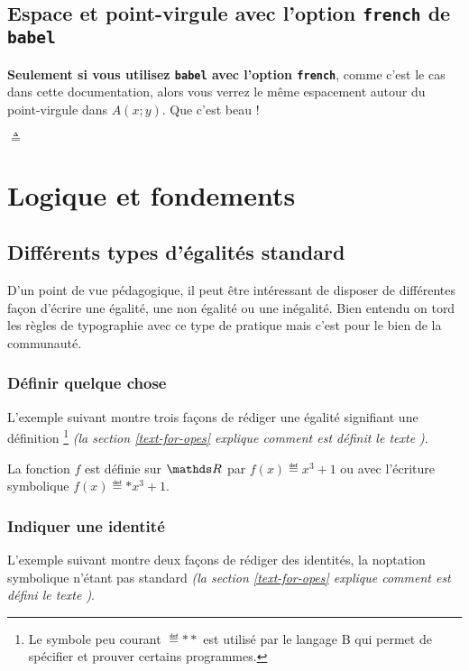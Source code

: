 \documentclass[12pt,a4paper]{article}
\theoremstyle{definition}
\begin{document}
\subsection{Espace et point-virgule avec l'option \texttt{french} de \texttt{babel}}

\textbf{Seulement si vous utilisez \texttt{babel} avec l'option \texttt{french}}, comme c'est le cas dans cette documentation, alors vous verrez le même espacement autour du point-virgule dans $A(x;y)$. Que c'est beau !




$\triangleq$
\section{Logique et fondements}

\subsection{Différents types d'égalités \og standard \fg}

D'un point de vue pédagogique, il peut être intéressant de disposer de différentes façon d'écrire une égalité, une non égalité ou une inégalité.
Bien entendu on tord les règles de typographie avec ce type de pratique mais c'est pour le bien de la communauté.

\subsubsection{Définir quelque chose}

L'exemple suivant montre trois façons de rédiger une égalité signifiant une définition
\footnote{
	Le symbole peu courant $\eqdef**$ est utilisé par le langage B qui permet de spécifier et prouver certains programmes.
}
\emph{(la section \ref{text-for-opes} explique comment est définit le texte \emph{\og \textopdef \fg})}.

\begin{tcblisting}{}
La fonction $f$ est définie sur $\RR$ par $f(x) \eqdef x^3 + 1$ ou avec l'écriture
symbolique $f(x) \eqdef* x^3 + 1$.
\end{tcblisting}


\subsubsection{Indiquer une identité}

L'exemple suivant montre deux façons de rédiger des identités, la noptation symbolique n'étant pas standard \emph{(la section \ref{text-for-opes} explique comment est défini le texte \emph{\og \textopid \fg})}.
\end{document}
